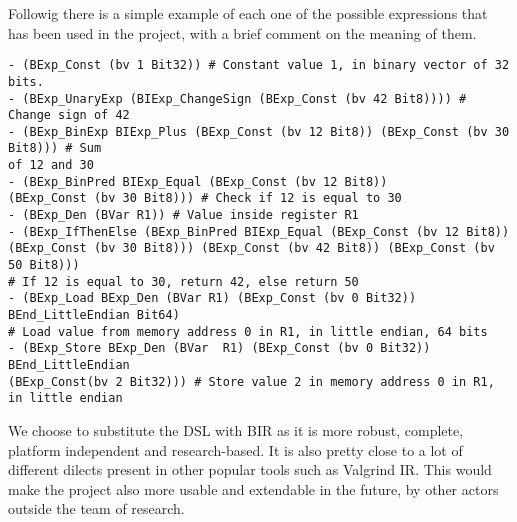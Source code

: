 Followig there is a simple example of each one of the possible expressions that has
been used in the project, with a brief comment on the meaning of them. \begin{verbatim}
- (BExp_Const (bv 1 Bit32)) # Constant value 1, in binary vector of 32 bits.
- (BExp_UnaryExp (BIExp_ChangeSign (BExp_Const (bv 42 Bit8)))) # Change sign of 42
- (BExp_BinExp BIExp_Plus (BExp_Const (bv 12 Bit8)) (BExp_Const (bv 30 Bit8))) # Sum
of 12 and 30
- (BExp_BinPred BIExp_Equal (BExp_Const (bv 12 Bit8)) 
(BExp_Const (bv 30 Bit8))) # Check if 12 is equal to 30
- (BExp_Den (BVar R1)) # Value inside register R1
- (BExp_IfThenElse (BExp_BinPred BIExp_Equal (BExp_Const (bv 12 Bit8)) 
(BExp_Const (bv 30 Bit8))) (BExp_Const (bv 42 Bit8)) (BExp_Const (bv 50 Bit8))) 
# If 12 is equal to 30, return 42, else return 50
- (BExp_Load BExp_Den (BVar R1) (BExp_Const (bv 0 Bit32)) BEnd_LittleEndian Bit64) 
# Load value from memory address 0 in R1, in little endian, 64 bits
- (BExp_Store BExp_Den (BVar  R1) (BExp_Const (bv 0 Bit32)) BEnd_LittleEndian 
(BExp_Const(bv 2 Bit32))) # Store value 2 in memory address 0 in R1, in little endian
\end{verbatim}

We choose to substitute the DSL with BIR as it is more robust, complete,
platform independent and research-based. It is also pretty close to a lot of different
dilects present in other popular tools such as Valgrind IR. This would make the
project also more usable and extendable in the future, by other actors outside the
team of research.